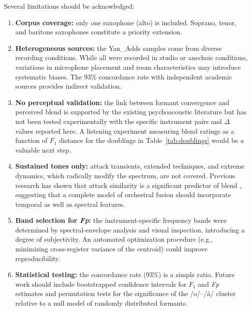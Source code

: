 \documentclass[12pt,a4paper]{article}
\begin{document}
Several limitations should be acknowledged:

\begin{enumerate}
\item \textbf{Corpus coverage:} only one saxophone (alto) is included. Soprano,
tenor, and baritone saxophones constitute a priority extension.

\item \textbf{Heterogeneous sources:} the Yan\_Adds samples come from diverse
recording conditions. While all were recorded in studio or anechoic conditions,
variations in microphone placement and room characteristics may introduce
systematic biases. The 93\% concordance rate with independent academic
sources provides indirect validation.

\item \textbf{No perceptual validation:} the link between formant convergence
and perceived blend is supported by the existing psychoacoustic literature
\citep{Sandell1995,Lembke2017} but has not been tested experimentally with
the specific instrument pairs and $\Delta$ values reported here. A listening
experiment measuring blend ratings as a function of $F_1$ distance for the
doublings in Table~\ref{tab:doublings} would be a valuable next step.

\item \textbf{Sustained tones only:} attack transients, extended techniques, and
extreme dynamics, which radically modify the spectrum, are not covered.
Previous research has shown that attack similarity is a significant predictor
of blend \citep{Sandell1995}, suggesting that a complete model of orchestral
fusion should incorporate temporal as well as spectral features.

\item \textbf{Band selection for \textit{Fp}:} the instrument-specific
frequency bands were determined by spectral-envelope analysis and visual
inspection, introducing a degree of subjectivity. An automated optimization
procedure (e.g., minimizing cross-register variance of the centroid) could
improve reproducibility.

\item \textbf{Statistical testing:} the concordance rate (93\%) is a simple
ratio. Future work should include bootstrapped confidence intervals for
$F_1$ and \textit{Fp} estimates and permutation tests for the significance
of the /o/--/\aa/ cluster relative to a null model of randomly distributed
formants.
\end{enumerate}
\end{document}
